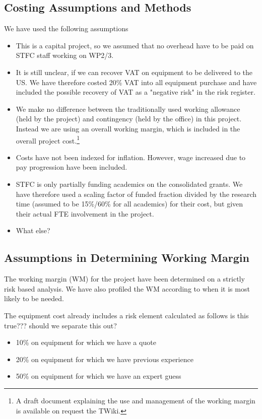 \subsection{Costing Assumptions and Methods}

We have used the following assumptions
\begin{itemize}
    \item This is a capital project, so we assumed that no overhead have to be paid on STFC staff working on WP2/3. 
    \item It is still unclear, if we can recover VAT on equipment to be delivered to the US. We have therefore costed 20\% VAT into all equipment purchase and have included the possible recovery of VAT as a "negative risk" in the risk register.
    \item We make no difference between the traditionally used working allowance (held by the project) and contingency (held by the office) in this project. Instead we are using an overall working margin, which is included in the overall project cost.\footnote{A draft document explaining the use and management of the working margin is available on request the TWiki.}
    \item Costs have not been indexed for inflation. However, wage increased due to pay progression have been included.
    \item STFC is only partially funding academics on the consolidated grants. We have therefore used a scaling factor of funded fraction divided by the research time (assumed to be 15\%/60\% for all academics) for their cost, but given their actual FTE involvement in the project.
    \item \color{red}What else?
\end{itemize}



\subsection{Assumptions in Determining Working Margin}

The working margin (WM) for the project have been determined on a strictly risk based analysis. We have also profiled the WM according to when it is most likely to be needed.

The equipment cost already includes a risk element calculated as follows {\color{red} is this true??? should we separate this out?}
\begin{itemize}
    \item 10\% on equipment for which we have a quote
    \item 20\% on equipment for which we have previous experience
    \item 50\% on equipment for which we have an expert guess
\end{itemize}

